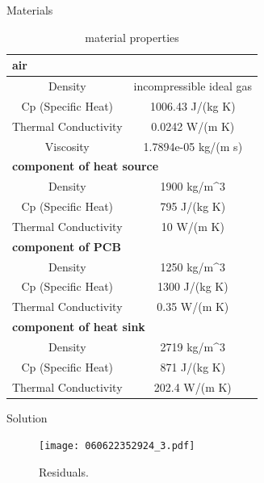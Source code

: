 \documentclass[10pt, xcolor=table]{beamer}
\begin{document}
\begin{frame}{Materials}
	\begin{table}[]
		\begin{tabular}{|cc|}
		\hline
		\multicolumn{2}{|l|}{\textbf{air}}                                        \\ \hline
		\multicolumn{1}{|c|}{Density}              & incompressible ideal gas     \\ \hline
		\multicolumn{1}{|c|}{Cp (Specific Heat)}   & 1006.43 J/(kg K)             \\ \hline
		\multicolumn{1}{|c|}{Thermal Conductivity} & 0.0242 W/(m K)               \\ \hline
		\multicolumn{1}{|c|}{Viscosity}            & 1.7894e-05 kg/(m s)          \\ \hline
		\multicolumn{2}{|l|}{\textbf{component of heat source}}                   \\ \hline
		\multicolumn{1}{|c|}{Density}              & 1900 kg/m\textasciicircum{}3 \\ \hline
		\multicolumn{1}{|c|}{Cp (Specific Heat)}   & 795 J/(kg K)                 \\ \hline
		\multicolumn{1}{|c|}{Thermal Conductivity} & 10 W/(m K)                   \\ \hline
		\multicolumn{2}{|l|}{\textbf{component of PCB}}                           \\ \hline
		\multicolumn{1}{|c|}{Density}              & 1250 kg/m\textasciicircum{}3 \\ \hline
		\multicolumn{1}{|c|}{Cp (Specific Heat)}   & 1300 J/(kg K)                \\ \hline
		\multicolumn{1}{|c|}{Thermal Conductivity} & 0.35 W/(m K)                 \\ \hline
		\multicolumn{2}{|l|}{\textbf{component of heat sink}}                     \\ \hline
		\multicolumn{1}{|c|}{Density}              & 2719 kg/m\textasciicircum{}3 \\ \hline
		\multicolumn{1}{|c|}{Cp (Specific Heat)}   & 871 J/(kg K)                 \\ \hline
		\multicolumn{1}{|c|}{Thermal Conductivity} & 202.4 W/(m K)                \\ \hline
		\end{tabular}
		\caption[]{material properties}
		\end{table}
\end{frame}
\begin{frame}{Solution}
	\begin{figure}
		\texttt{[image: 060622352924\_3.pdf]}
		\caption{Residuals.}
	\end{figure}	
\end{frame}
\end{document}
